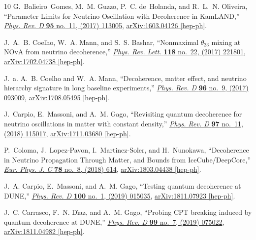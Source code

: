 \documentclass[aps, prd, onecolumn, tightenlines, notitlepage, superscriptaddress, nofootinbib, preprintnumbers, floatfix,showkeys,11pt]{revtex4-2}
\begin{document}
\begin{thebibliography}{10}
G.~Balieiro~Gomes, M.~M. Guzzo, P.~C. de~Holanda, and R.~L.~N. Oliveira,
  ``{Parameter Limits for Neutrino Oscillation with Decoherence in KamLAND},''
  \href{http://dx.doi.org/10.1103/PhysRevD.95.113005}{{\em Phys. Rev. D}
  {\bfseries 95} no.~11, (2017) 113005},
  \href{http://arxiv.org/abs/1603.04126}{{\ttfamily arXiv:1603.04126
  [hep-ph]}}.

J.~A.~B. Coelho, W.~A. Mann, and S.~S. Bashar, ``{Nonmaximal $\theta_{23}$
  mixing at NOvA from neutrino decoherence},''
  \href{http://dx.doi.org/10.1103/PhysRevLett.118.221801}{{\em Phys. Rev.
  Lett.} {\bfseries 118} no.~22, (2017) 221801},
  \href{http://arxiv.org/abs/1702.04738}{{\ttfamily arXiv:1702.04738
  [hep-ph]}}.

J.~a. A.~B. Coelho and W.~A. Mann, ``{Decoherence, matter effect, and neutrino
  hierarchy signature in long baseline experiments},''
  \href{http://dx.doi.org/10.1103/PhysRevD.96.093009}{{\em Phys. Rev. D}
  {\bfseries 96} no.~9, (2017) 093009},
  \href{http://arxiv.org/abs/1708.05495}{{\ttfamily arXiv:1708.05495
  [hep-ph]}}.

J.~Carpio, E.~Massoni, and A.~M. Gago, ``{Revisiting quantum decoherence for
  neutrino oscillations in matter with constant density},''
  \href{http://dx.doi.org/10.1103/PhysRevD.97.115017}{{\em Phys. Rev. D}
  {\bfseries 97} no.~11, (2018) 115017},
  \href{http://arxiv.org/abs/1711.03680}{{\ttfamily arXiv:1711.03680
  [hep-ph]}}.

P.~Coloma, J.~Lopez-Pavon, I.~Martinez-Soler, and H.~Nunokawa, ``{Decoherence
  in Neutrino Propagation Through Matter, and Bounds from IceCube/DeepCore},''
  \href{http://dx.doi.org/10.1140/epjc/s10052-018-6092-6}{{\em Eur. Phys. J. C}
  {\bfseries 78} no.~8, (2018) 614},
  \href{http://arxiv.org/abs/1803.04438}{{\ttfamily arXiv:1803.04438
  [hep-ph]}}.

J.~A. Carpio, E.~Massoni, and A.~M. Gago, ``{Testing quantum decoherence at
  DUNE},'' \href{http://dx.doi.org/10.1103/PhysRevD.100.015035}{{\em Phys. Rev.
  D} {\bfseries 100} no.~1, (2019) 015035},
  \href{http://arxiv.org/abs/1811.07923}{{\ttfamily arXiv:1811.07923
  [hep-ph]}}.

J.~C. Carrasco, F.~N. D\'\i{}az, and A.~M. Gago, ``{Probing CPT breaking
  induced by quantum decoherence at DUNE},''
  \href{http://dx.doi.org/10.1103/PhysRevD.99.075022}{{\em Phys. Rev. D}
  {\bfseries 99} no.~7, (2019) 075022},
  \href{http://arxiv.org/abs/1811.04982}{{\ttfamily arXiv:1811.04982
  [hep-ph]}}.


\end{thebibliography}
\end{document}
